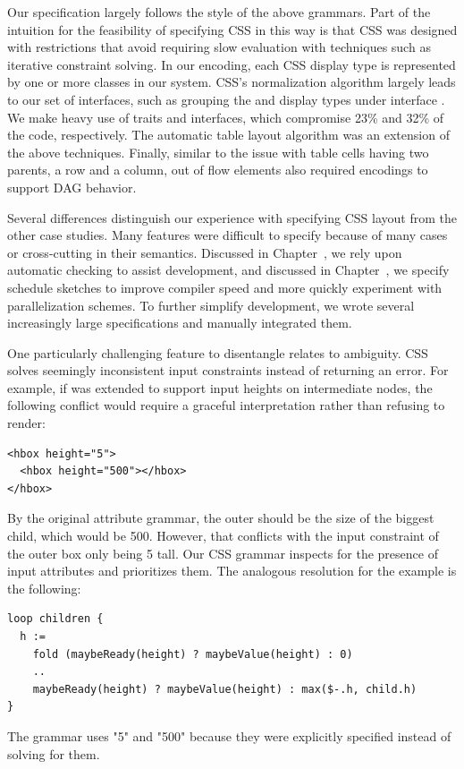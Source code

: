 Our specification largely follows the style of the above grammars. Part of the intuition for the feasibility of specifying CSS in this way is that CSS was designed with restrictions that avoid requiring slow evaluation with techniques such as iterative constraint solving. In our encoding, each CSS display type is represented by one or more classes in our system. CSS's normalization algorithm largely leads to our set of interfaces, such as grouping the  and  display types under interface . We make heavy use of traits and interfaces, which compromise 23\% and 32\% of the code, respectively. The automatic table layout algorithm was an extension of the above techniques. Finally, similar to the issue with table cells having two parents, a row and a column, out of flow elements also required encodings to support DAG behavior. 

Several differences distinguish our experience with specifying CSS layout from the other case studies. Many features were difficult to specify because of many cases or cross-cutting in their semantics. Discussed in Chapter~\cite{??}, we rely upon automatic checking to assist development, and discussed in Chapter~\cite{??}, we specify schedule sketches to improve compiler speed and more quickly experiment with parallelization schemes. To further simplify development, we wrote several increasingly large specifications and manually integrated them.

One particularly challenging feature to disentangle relates to ambiguity. CSS  solves seemingly inconsistent input constraints instead of returning an error. For example, if \hlang was extended to support input heights on intermediate nodes, the following conflict would require a graceful interpretation rather than refusing to render:
\begin{lstlisting}
<hbox height="5">
  <hbox height="500"></hbox>
</hbox>
\end{lstlisting}
By the original attribute grammar, the outer  should be the size of the biggest child, which would be 500. However, that conflicts with the input constraint of the outer box only being 5 tall. Our CSS grammar inspects for the presence of input attributes and prioritizes them. The analogous resolution for the \hlang example is the following:
\begin{lstlisting}
loop children { 
  h := 
    fold (maybeReady(height) ? maybeValue(height) : 0)
    ..
    maybeReady(height) ? maybeValue(height) : max($-.h, child.h) 
}
\end{lstlisting}
The grammar uses "5" and "500" because they were explicitly specified instead of solving for them.  

